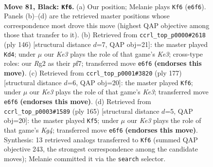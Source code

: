\documentclass[11pt]{article}
\begin{document}
\clearpage

\begin{figure}[p]\centering
\begin{subfigure}{0.46\textwidth}\centering
\resizebox{\linewidth}{!}{%
\newchessgame
\chessboard[
  setfen={8/8/4k3/2p5/p2pK3/8/6r1/8 b - - 3 81},
  showmover=false,
  pgfstyle=straightmove, color=movearrow, markmove={e6-f6}
]}
\caption{}
\end{subfigure}\hfill
\begin{subfigure}{0.46\textwidth}\centering
\resizebox{\linewidth}{!}{%
\newchessgame
\chessboard[
  setfen={8/5p2/8/3p4/7k/4K2P/6P1/8 w - - 4 74},
  showmover=false,
  pgfstyle=straightmove, color=movearrow, markmove={e3-d4}
]}
\caption{}
\end{subfigure}
\\[4pt]
\begin{subfigure}{0.46\textwidth}\centering
\resizebox{\linewidth}{!}{%
\newchessgame
\chessboard[
  setfen={8/8/4k3/2R5/5p2/6p1/5p2/5K2 b - - 75 89},
  showmover=false,
  pgfstyle=straightmove, color=movearrow, markmove={e6-f6}
]}
\caption{}
\end{subfigure}\hfill
\begin{subfigure}{0.46\textwidth}\centering
\resizebox{\linewidth}{!}{%
\newchessgame
\chessboard[
  setfen={8/8/8/6k1/3R4/5pp1/7p/7K b - - 3 83},
  showmover=false,
  pgfstyle=straightmove, color=movearrow, markmove={g5-f5}
]}
\caption{}
\end{subfigure}
\caption{\textbf{Move 81, Black: \texttt{Kf6}.} (a) Our position; Melanie plays \texttt{Kf6} (\texttt{e6f6}). Panels (b)--(d) are the retrieved master positions whose correspondence most drove this move (highest QAP objective among those that transfer to it). (b) Retrieved from \texttt{ccrl\_top\_p0000\#2618} (ply 146) [structural distance $d$=7, QAP obj=21]: the master played \texttt{Kd4}; under $\mu$ our \emph{Ke3} plays the role of that game's \emph{Ke3}; cross-type roles: our \emph{R}g2 as their \emph{p}f7; transferred move \texttt{e6f6} \textbf{(endorses this move)}. (c) Retrieved from \texttt{ccrl\_top\_p0001\#3820} (ply 177) [structural distance $d$=6, QAP obj=20]: the master played \texttt{Kf6}; under $\mu$ our \emph{Ke3} plays the role of that game's \emph{Ke3}; transferred move \texttt{e6f6} \textbf{(endorses this move)}. (d) Retrieved from \texttt{ccrl\_top\_p0003\#1589} (ply 165) [structural distance $d$=5, QAP obj=20]: the master played \texttt{Kf5}; under $\mu$ our \emph{Ke3} plays the role of that game's \emph{Kg4}; transferred move \texttt{e6f6} \textbf{(endorses this move)}. Synthesis: 13 retrieved analogs transferred to \texttt{Kf6} (summed QAP objective 243, the strongest correspondence among the candidate moves); Melanie committed it via the \texttt{search} selector.}
\label{fig:thought-m161}
\end{figure}
\end{document}

